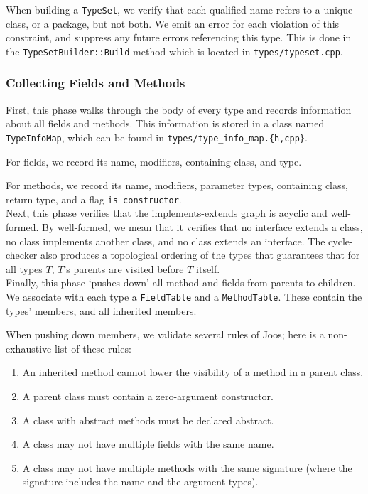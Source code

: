 \documentclass[12pt, titlepage]{article}
\newcommand{\z}[1]{\texttt{#1}}
\begin{document}
When building a \z{TypeSet}, we verify that each qualified name refers to a
unique class, or a package, but not both. We emit an error for each violation
of this constraint, and suppress any future errors referencing this type. This
is done in the \z{TypeSetBuilder::Build} method which is located in
\z{types/typeset.cpp}.

\subsubsection{Collecting Fields and Methods}\label{subsubsec:fields}

First, this phase walks through the body of every type and records information
about all fields and methods. This information is stored in a class named
\z{TypeInfoMap}, which can be found in \z{types/type\_info\_map.\{h,cpp\}}.

For fields, we record its name, modifiers, containing class, and type.

For methods, we record its name, modifiers, parameter types, containing class,
return type, and a flag \z{is\_constructor}.\\

Next, this phase verifies that the implements-extends graph is acyclic and
well-formed. By well-formed, we mean that it verifies that no interface extends
a class, no class implements another class, and no class extends an interface.
The cycle-checker also produces a topological ordering of the types that
guarantees that for all types $T$, $T$'s parents are visited before $T$
itself.\\

Finally, this phase `pushes down' all method and fields from parents to
children. We associate with each type a \z{FieldTable} and a \z{MethodTable}. These
contain the types' members, and all inherited members.

When pushing down members, we validate several rules of Joos; here is a
non-exhaustive list of these rules:
\begin{enumerate}
  \item An inherited method cannot lower the visibility of a method in a parent
  class.

  \item A parent class must contain a zero-argument constructor.

  \item A class with abstract methods must be declared abstract.

  \item A class may not have multiple fields with the same name.

  \item A class may not have multiple methods with the same signature (where
  the signature includes the name and the argument types).
\end{enumerate}
\end{document}
